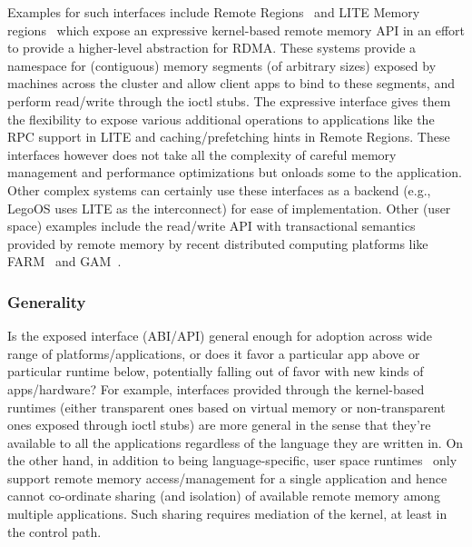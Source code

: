 Examples for such interfaces include Remote 
Regions~\cite{remregions} and LITE Memory regions~\cite{literdma} 
which expose an expressive
kernel-based remote memory API in an effort to provide a 
higher-level abstraction for RDMA.
These systems provide a namespace for (contiguous) memory 
segments (of arbitrary sizes) exposed by machines across the 
cluster and allow client apps to bind to these segments, 
and perform read/write through the ioctl stubs. The expressive 
interface gives them the flexibility to expose various 
additional operations to applications like the RPC support in 
LITE and caching/prefetching hints in Remote Regions. 
These interfaces however does not take all the complexity of 
careful memory management and performance optimizations but
onloads some to the application. Other complex systems can 
certainly use these interfaces as a backend 
(e.g., LegoOS uses LITE as the interconnect) for ease of 
implementation. Other (user space) examples include the 
read/write API with transactional semantics provided by
remote memory by recent distributed computing platforms like
FARM~\cite{farm} and GAM~\cite{gam}.


\subsubsection{Generality} 
Is the exposed interface (ABI/API) 
general enough for adoption across wide range of 
platforms/applications, or does it favor a particular app 
above or particular runtime below, potentially falling out 
of favor with new kinds of apps/hardware? For example,
interfaces provided through the kernel-based runtimes 
(either transparent ones based on virtual memory or 
non-transparent ones exposed through ioctl stubs) are more 
general in the sense that they're available to  
all the applications regardless of the language they are 
written in. On the other hand, in addition to being 
language-specific, user space runtimes~\cite{aifm,semeru} 
only support remote memory 
access/management for a single application and hence cannot 
co-ordinate sharing (and isolation) of available remote 
memory among multiple applications. Such sharing requires 
mediation of the kernel, at least in the control path.


